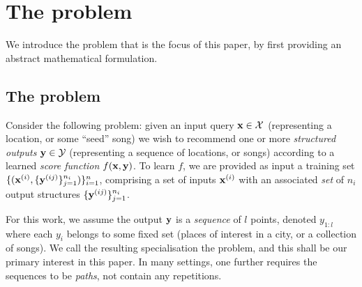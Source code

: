 
\section{The {\trajrec} problem}
\label{sec:recseq}

We introduce the {\trajrec} problem that is the focus of this paper,
by first providing an abstract mathematical formulation.


\subsection{The {\seqrec} problem}

Consider the following %
\emph{{\seqrec}} problem:
given an input query $\mathbf{x} \in \mathcal{X}$ (representing \eg a location, or some ``seed'' song)
we wish to recommend one or more \emph{structured outputs} $\mathbf{y} \in \mathcal{Y}$ (representing \eg a sequence of locations, or songs)
according to a learned \emph{score function} $f(\mathbf{x},\mathbf{y})$.
To learn $f$,
we are provided as input a training set
$\{ ( \mathbf{x}^{({i})}, \{ \mathbf{y}^{({ij})} \}_{j=1}^{n_i} ) \}_{i=1}^{n}$,
comprising a set %
of inputs $\mathbf{x}^{({i})}$ with an associated \emph{set} of $n_i$ output structures $\{ \mathbf{y}^{({ij})} \}_{j=1}^{n_i}$.

For this work, we assume the output $\mathbf{y}$ is a \emph{sequence} of $l$ points, denoted $y_{1:l}$
where each $y_i$ belongs to some fixed set (\eg places of interest in a city, or a collection of songs).
We call the resulting specialisation the \emph{{\seqrec}} problem,
and this shall be our primary interest in this paper.
In many settings, one further requires the sequences to be \emph{paths}, \ie not contain any repetitions.

